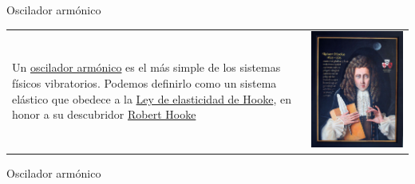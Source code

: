 \documentclass[handout,hyperref={colorlinks=true}]{beamer}
\begin{document}
\begin{frame}{Oscilador armónico}\label{resortito}

\begin{tabular}{m{6cm} m{2cm}}
 Un \href{http://es.wikipedia.org/wiki/Oscilador_armónico}{oscilador armónico} es el más simple de los sistemas físicos vibratorios. Podemos definirlo como un sistema
elástico que obedece a la \href{http://es.wikipedia.org/wiki/Ley_de_Hooke}{Ley de elasticidad de Hooke}, en honor a su descubridor 
\href{http://es.wikipedia.org/wiki/Robert_Hooke}{Robert Hooke} & \includegraphics[scale=.15]{imagenes/Hooke.JPG}\\
\end{tabular}

 
\end{frame}

\begin{frame}{Oscilador armónico}\label{resortito}

\begin{center}
\end{center}
 
\end{frame}
\end{document}
